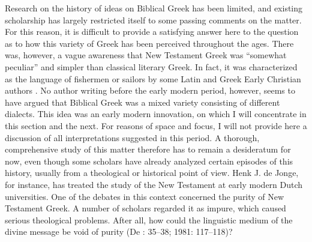 Research on the history of ideas on Biblical Greek has been limited, and existing scholarship has largely restricted itself to some passing comments on the matter. For this reason, it is difficult to provide a satisfying answer here to the question as to how this variety of Greek has been perceived throughout the ages. There was, however, a vague awareness that New Testament Greek was “somewhat peculiar” and simpler than classical literary Greek. In fact, it was characterized as the language of fishermen or sailors by some Latin and Greek Early Christian authors \citep[647]{Janse2007}. No author writing before the early modern period, however, seems to have argued that Biblical Greek was a mixed variety consisting of different dialects. This idea was an early modern innovation, on which I will concentrate in this section and the next. For reasons of space and focus, I will not provide here a discussion of all interpretations suggested in this period. A thorough, comprehensive study of this matter therefore has to remain a desideratum for now, even though some scholars have already analyzed certain episodes of this history, usually from a theological or historical point of view. Henk J. de Jonge, for instance, has treated the study of the New Testament at early modern Dutch universities. One of the debates in this context concerned the purity of New Testament Greek. A number of scholars regarded it as impure, which caused serious theological problems. After all, how could the linguistic medium of the divine message be void of purity (De \citealt{Jonge1980}: 35–38; 1981: 117–118)?

